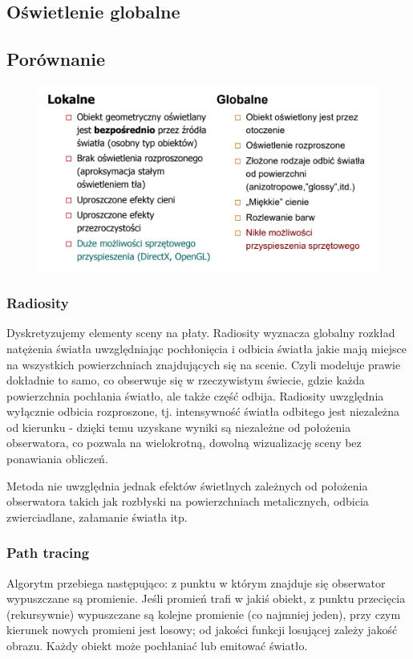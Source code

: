 \documentclass[12pt]{article}
\begin{document}
\subsection{Oświetlenie globalne}

\subsection{Porównanie}
\begin{figure}[H]
	\centering
	\includegraphics[scale=0.5]{Pictures/oswietlenie.png}
	\caption{}
\end{figure}

\subsubsection{Radiosity}
Dyskretyzujemy elementy sceny na płaty. Radiosity wyznacza globalny rozkład natężenia światła uwzględniając pochłonięcia i odbicia światła jakie mają miejsce na wszystkich powierzchniach znajdujących się na scenie. Czyli modeluje prawie dokładnie to samo, co obserwuje się w rzeczywistym świecie, gdzie każda powierzchnia pochłania światło, ale także część odbija. Radiosity uwzględnia wyłącznie odbicia rozproszone, tj. intensywność światła odbitego jest niezależna od kierunku - dzięki temu uzyskane wyniki są niezależne od położenia obserwatora, co pozwala na wielokrotną, dowolną wizualizację sceny bez ponawiania obliczeń.

Metoda nie uwzględnia jednak efektów świetlnych zależnych od położenia obserwatora takich jak rozbłyski na powierzchniach metalicznych, odbicia zwierciadlane, załamanie światła itp.

\subsubsection{Path tracing}
Algorytm przebiega następująco: z punktu w którym znajduje się obserwator wypuszczane są promienie. Jeśli promień trafi w jakiś obiekt, z punktu przecięcia (rekursywnie) wypuszczane są kolejne promienie (co najmniej jeden), przy czym kierunek nowych promieni jest losowy; od jakości funkcji losującej zależy jakość obrazu. Każdy obiekt może pochłaniać lub emitować światło.
\end{document}

